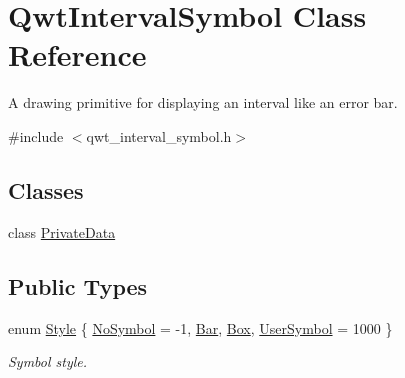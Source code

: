 \hypertarget{class_qwt_interval_symbol}{\section{Qwt\-Interval\-Symbol Class Reference}
\label{class_qwt_interval_symbol}
}


A drawing primitive for displaying an interval like an error bar.  




{\ttfamily \#include $<$qwt\-\_\-interval\-\_\-symbol.\-h$>$}

\subsection*{Classes}
\begin{DoxyCompactItemize}
\item 
class \hyperlink{class_qwt_interval_symbol_1_1_private_data}{Private\-Data}
\end{DoxyCompactItemize}
\subsection*{Public Types}
\begin{DoxyCompactItemize}
\item 
enum \hyperlink{class_qwt_interval_symbol_a8fe960fd50b3ad08765ef8bb632ad77e}{Style} \{ \hyperlink{class_qwt_interval_symbol_a8fe960fd50b3ad08765ef8bb632ad77ea48e0d047b9988e77067a11f784556019}{No\-Symbol} = -\/1, 
\hyperlink{class_qwt_interval_symbol_a8fe960fd50b3ad08765ef8bb632ad77ea1e4120af73e888e2edf05798d906e934}{Bar}, 
\hyperlink{class_qwt_interval_symbol_a8fe960fd50b3ad08765ef8bb632ad77eaf4f31197926c38dcc0377bb75ed5e6e1}{Box}, 
\hyperlink{class_qwt_interval_symbol_a8fe960fd50b3ad08765ef8bb632ad77ea40c2cb30f61f7ad63ff20482efd0e7b0}{User\-Symbol} = 1000
 \}
\begin{DoxyCompactList}\small\item\em Symbol style. \end{DoxyCompactList}\end{DoxyCompactItemize}
